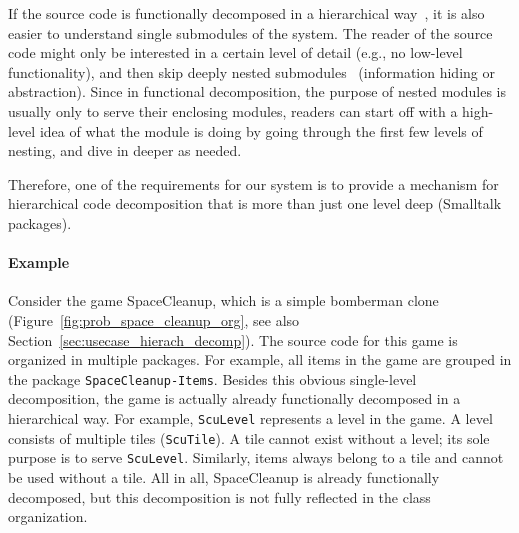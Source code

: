 If the source code is functionally decomposed in a hierarchical way~\cite{Tsui:2009:ESE:1823101}, it is also easier to understand single submodules of the system. The reader of the source code might only be interested in a certain level of detail (e.g., no low-level functionality), and then skip deeply nested submodules~\cite{hierarch1} (information hiding or abstraction). Since in functional decomposition, the purpose of nested modules is usually only to serve their enclosing modules, readers can start off with a high-level idea of what the module is doing by going through the first few levels of nesting, and dive in deeper as needed.

Therefore, one of the requirements for our system is to provide a mechanism for hierarchical code decomposition that is more than just one level deep (Smalltalk packages).

\paragraph{Example}
Consider the game SpaceCleanup, which is a simple bomberman clone (Figure~\ref{fig:prob_space_cleanup_org}, see also Section~\ref{sec:usecase_hierach_decomp}). The source code for this game is organized in multiple packages. For example, all items in the game are grouped in the package \texttt{SpaceCleanup-Items}. Besides this obvious single-level decomposition, the game is actually already functionally decomposed in a hierarchical way. For example, \texttt{ScuLevel} represents a level in the game. A level consists of multiple tiles (\texttt{ScuTile}). A tile cannot exist without a level; its sole purpose is to serve \texttt{ScuLevel}. Similarly, items always belong to a tile and cannot be used without a tile. All in all, SpaceCleanup is already functionally decomposed, but this decomposition is not fully reflected in the class organization.

